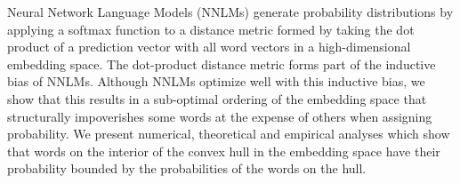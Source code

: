 Neural Network Language Models (NNLMs) generate probability distributions by applying a softmax function to a distance metric formed by taking the dot product of a prediction vector with all word vectors in a high-dimensional embedding space.  The dot-product distance metric forms part of the inductive bias of NNLMs.  Although NNLMs optimize well with this inductive bias, we show that this results in a sub-optimal ordering of the embedding space that structurally impoverishes some words at the expense of others when assigning probability.  We present numerical, theoretical and empirical analyses which show that words on the interior of the convex hull in the embedding space have their probability bounded by the probabilities of the words on the hull.
